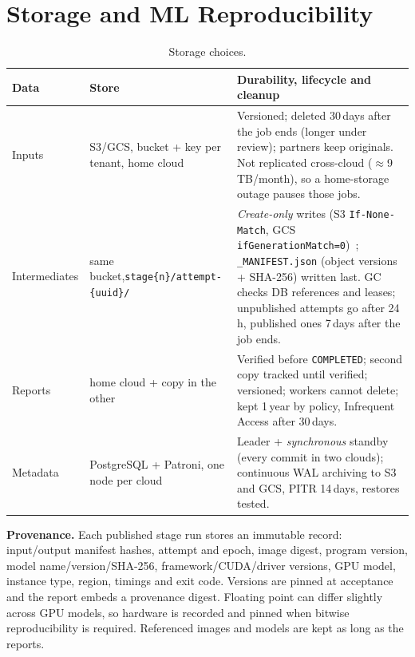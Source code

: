 \documentclass[10pt,a4paper]{article}
\begin{document}
\section{Storage and ML Reproducibility}
\begin{table}[H]\centering\small
\begin{tabularx}{\linewidth}{@{}L{1.9cm}L{3.0cm}Y@{}}
\toprule
\textbf{Data} & \textbf{Store} & \textbf{Durability, lifecycle and cleanup} \\ \midrule
Inputs & S3/GCS, bucket + key per tenant, home cloud & Versioned; deleted 30\,days after the job ends (longer under review);
  partners keep originals. Not replicated cross-cloud ($\approx$9\,TB/month), so a home-storage outage
  pauses those jobs. \\
Intermediates & same bucket,\newline \texttt{stage\{n\}/}\newline\texttt{attempt-\{uuid\}/} & \emph{Create-only} writes (S3 \texttt{If-None-Match},
  GCS \texttt{ifGenerationMatch=0})~\cite{s3-cond,gcs-pre}; \texttt{\_MANIFEST.json} (object versions + SHA-256)
  written last. GC checks DB references and leases; unpublished attempts go after 24\,h, published ones
  7\,days after the job ends. \\
Reports & home cloud + copy in the other & Verified before \texttt{COMPLETED}; second copy tracked until verified; versioned; workers cannot
  delete; kept 1\,year by policy, Infrequent Access after 30\,days. \\
Metadata & PostgreSQL + Patroni, one node per cloud & Leader + \emph{synchronous} standby (every commit in two clouds); continuous
  WAL archiving to S3 and GCS, PITR 14\,days, restores tested. \\
\bottomrule
\end{tabularx}
\caption{Storage choices.}
\end{table}
\vspace{-8pt}
\textbf{Provenance.} Each published stage run stores an immutable record: input/output manifest hashes,
attempt and epoch, image digest, program version, model name/version/SHA-256, framework/CUDA/driver
versions, GPU model, instance type, region, timings and exit code. Versions are pinned at acceptance and
the report embeds a provenance digest. Floating point can differ slightly across GPU models, so hardware
is recorded and pinned when bitwise reproducibility is required. Referenced images and models are kept as
long as the reports.

\end{document}
